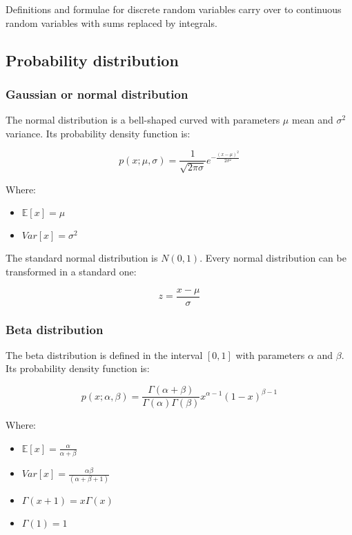 	Definitions and formulae for discrete random variables carry over to continuous random variables with sums replaced by integrals.

	\subsection{Probability distribution}

		\subsubsection{Gaussian or normal distribution}
		The normal distribution is a bell-shaped curved with parameters $\mu$ mean and $\sigma^2$ variance.
		Its probability density function is:

		$$p(x;\mu,\sigma) = \frac{1}{\sqrt{2\pi\sigma}}e^{-\frac{(x-\mu)^2}{2\sigma^2}}$$

		Where:

		\begin{multicols}{2}
			\begin{itemize}
				\item $\mathbb{E}[x] = \mu$
				\item $Var[x] = \sigma^2$
			\end{itemize}
		\end{multicols}

		The standard normal distribution is $N(0,1)$.
		Every normal distribution can be transformed in a standard one:

		$$z = \frac{x-\mu}{\sigma}$$

		\subsubsection{Beta distribution}
		The beta distribution is defined in the interval $[0,1]$ with parameters $\alpha$ and $\beta$.
		Its probability density function is:

		$$p(x;\alpha, \beta) = \frac{\Gamma(\alpha + \beta)}{\Gamma(\alpha)\Gamma(\beta)}x^{\alpha-1}(1-x)^{\beta-1}$$

		Where:

		\begin{multicols}{2}
			\begin{itemize}
				\item $\mathbb{E}[x] = \frac{\alpha}{\alpha+\beta}$
				\item $Var[x] = \frac{\alpha\beta}{(\alpha+\beta+1)}$
				\item $\Gamma(x+1) = x\Gamma(x)$
				\item $\Gamma(1) = 1$
			\end{itemize}
		\end{multicols}

